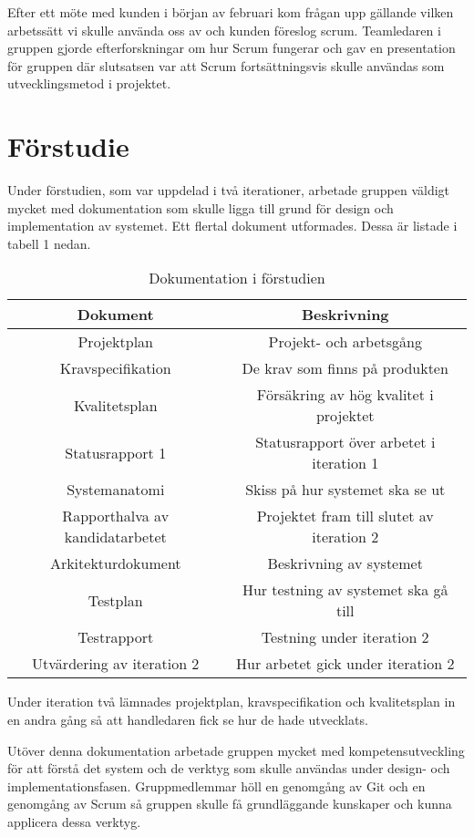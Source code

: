 Efter ett möte med kunden i början av februari kom frågan upp gällande vilken arbetssätt vi skulle använda oss av och kunden föreslog scrum. Teamledaren i gruppen gjorde efterforskningar om hur Scrum fungerar och gav en presentation för gruppen där slutsatsen var att Scrum fortsättningsvis skulle användas som utvecklingsmetod i projektet.

\section{Förstudie}
\label{sec:forstudie}
Under förstudien, som var uppdelad i två iterationer, arbetade gruppen väldigt mycket med dokumentation som skulle ligga till grund för design och implementation av systemet. Ett flertal dokument utformades. Dessa är listade i tabell 1 nedan.

\begin{table}
\centering
\caption{Dokumentation i förstudien}
\begin{tabular}{|c|c|}
\hline
\textbf{Dokument} & \textbf{Beskrivning} \\
\hline
Projektplan & Projekt- och arbetsgång \\
\hline
Kravspecifikation & De krav som finns på produkten \\
\hline
Kvalitetsplan & Försäkring av hög kvalitet i projektet \\
\hline
Statusrapport 1 & Statusrapport över arbetet i iteration 1 \\
\hline
Systemanatomi & Skiss på hur systemet ska se ut \\
\hline
Rapporthalva av kandidatarbetet & Projektet fram till slutet av iteration 2 \\
\hline
Arkitekturdokument & Beskrivning av systemet \\
\hline
Testplan & Hur testning av systemet ska gå till \\
\hline
Testrapport & Testning under iteration 2 \\
\hline
Utvärdering av iteration 2 & Hur arbetet gick under iteration 2 \\
\hline
\end{tabular}
\end{table}

Under iteration två lämnades projektplan, kravspecifikation och kvalitetsplan in en andra gång så att handledaren fick se hur de hade utvecklats.

Utöver denna dokumentation arbetade gruppen mycket med kompetensutveckling för att förstå det system och de verktyg som skulle användas under design- och implementationsfasen. Gruppmedlemmar höll en genomgång av Git och en genomgång av Scrum så gruppen skulle få grundläggande kunskaper och kunna applicera dessa verktyg.

